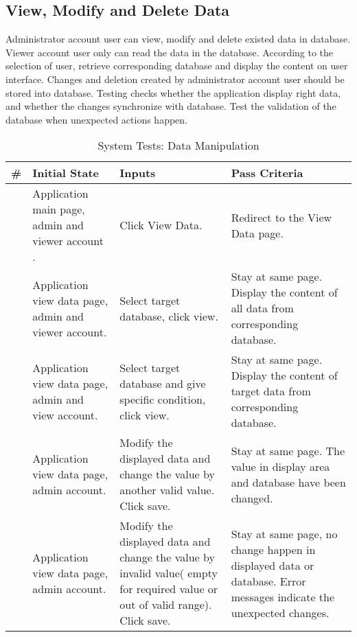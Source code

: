 \documentclass[12pt]{article}
\newcounter{TestCounter}
\begin{document}
\subsection{View, Modify and Delete Data} 
Administrator account user can view, modify and delete existed data in database. Viewer account user only can read the data in the database.  According to the selection of user, retrieve corresponding database and display the content on user interface. Changes and deletion created by administrator account user should be stored into database. Testing checks whether the application display right data, and  whether the changes synchronize with database. Test the validation of the database when unexpected actions happen.
\begin{center}
	\begin{longtable}{c>{\raggedright\arraybackslash}p{4.8cm} >{\raggedright\arraybackslash}p{3cm}>{\raggedright\arraybackslash}p{3cm}}
		\caption{System Tests: Data Manipulation}\label{DataManipulation_SystemTests}\\
		\toprule
		\bf \# & \bf Initial State & \bf Inputs & \bf Pass Criteria  \\\midrule
		\stepcounter{TestCounter}\arabic{TestCounter} 
		& Application main page, admin and viewer account .
		& Click View Data.
		& Redirect to the View Data page.
		\\\midrule
		\stepcounter{TestCounter}\arabic{TestCounter} 
		& Application view data page, admin and viewer account.
		& Select target database, click view.
		& Stay at same page. Display the content of all data from corresponding database.
		\\\midrule
		\stepcounter{TestCounter}\arabic{TestCounter} 
		& Application view data page, admin and view account.
		& Select target database and give specific condition, click view. 
		& Stay at same page. Display the content of target data from corresponding database.
		\\\midrule
		\stepcounter{TestCounter}\arabic{TestCounter} 
		& Application view data page, admin account.
		& Modify the displayed data and change the value by another valid value. Click save.
		& Stay at same page. The value in display area and database have been changed.
		\\\midrule
		\stepcounter{TestCounter}\arabic{TestCounter} 
		& Application view data page, admin account.
		& Modify the displayed data and change the value by invalid value( empty for required value or out of valid range). Click save.
		& Stay at same page, no change happen in displayed data or database. Error messages indicate the unexpected changes.

\end{longtable}
\end{center}
\end{document}
